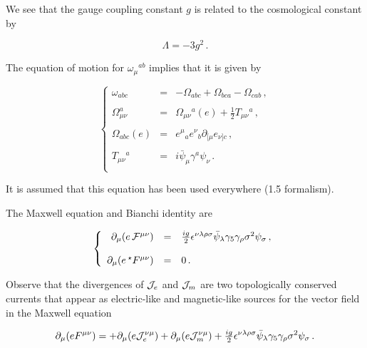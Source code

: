 \documentclass[12pt,a4paper]{article}
\begin{document}
We see that the gauge coupling constant $g$ is related to the
cosmological constant by

\begin{equation}
\Lambda=-3g^{2}\, .  
\end{equation}
 

The equation of motion for $\omega_{\mu}{}^{ab}$ implies that it is
given by 

\begin{equation}
\label{eq:torsionfulspinconnection}
\left\{
\begin{array}{rcl}
\omega_{abc} & = & 
-\Omega_{abc} + \Omega_{bca} - \Omega_{cab}\, ,\\
& & \\
\Omega_{\mu\nu}^{a} & = & \Omega_{\mu\nu}{}^{a} (e) 
+\frac{1}{2}T_{\mu\nu}{}^{a}\, ,\\
& & \\
\Omega_{abc}(e) & = & 
e^{\mu}{}_{a}e^{\nu}{}_{b} \partial_{[\mu}e_{\nu]c}\, ,\\
& & \\
T_{\mu\nu}{}^{a} & = & i\bar{\psi}_{\mu}\gamma^{a}\psi_{\nu}\, .\\
\end{array}
\right.
\end{equation}

\noindent It is assumed that this equation has been used everywhere 
(1.5 formalism).

The Maxwell equation and Bianchi identity are

\begin{equation}
\left\{
\begin{array}{rcl}
\partial_{\mu}(e\, {\cal F}^{\mu\nu}) 
& = & {\textstyle\frac{ig}{2}}\epsilon^{\nu\lambda\rho\sigma}
\bar{\psi}_{\lambda}\gamma_{5}\gamma_{\rho}\sigma^{2}\psi_{\sigma}\, ,\\
& & \\
\partial_{\mu}(e\, {}^{\star} F^{\mu\nu}) & = & 0\, .\\
\end{array}
\right.
\end{equation}

\noindent Observe that the divergences of ${\cal J}_{e}$ and 
${\cal J}_{m}$ are two topologically conserved currents that appear as
electric-like and magnetic-like sources for the vector field in the
Maxwell equation

\begin{equation}
\partial_{\mu}(eF^{\mu\nu})= 
+\partial_{\mu}(e {\cal J}_{e}^{\nu\mu})
+\partial_{\mu}(e{\cal J}_{m}^{\nu\mu})
+ {\textstyle\frac{ig}{2}}\epsilon^{\nu\lambda\rho\sigma}
\bar{\psi}_{\lambda}\gamma_{5}\gamma_{\rho}\sigma^{2}\psi_{\sigma}\, .  
\end{equation}
\end{document}
